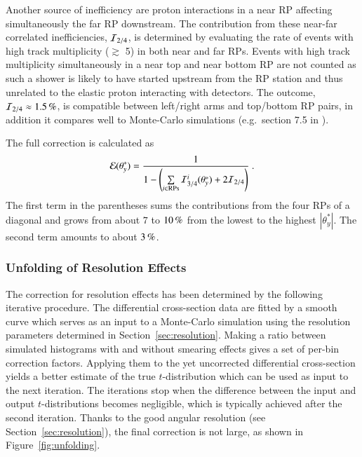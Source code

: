 Another source of inefficiency are proton interactions in a near RP affecting simultaneously the far RP downstream. The contribution from these near-far correlated inefficiencies, ${\cal I}_{2/4}$, is determined by evaluating the rate of events with high track multiplicity ($\gtrsim$ 5) in both near and far RPs. Events with high track multiplicity simultaneously in a near top and near bottom RP are not counted as such a shower is likely to have started upstream from the RP station and thus unrelated to the elastic proton interacting with detectors. The outcome, ${\cal I}_{2/4} \approx 1.5\,{\rm \%}$, is compatible between left/right arms and top/bottom RP pairs, in addition it compares well to Monte-Carlo simulations (e.g.~section 7.5 in \cite{hubert-thesis}).

The full correction is calculated as
\begin{equation}
\label{efficiency}
	{\cal E}(\theta_y^*) = {1\over 1 - \left( \sum\limits_{i\in \rm RPs} {\cal I}^i_{3/4}(\theta_y^*) + 2 {\cal I}_{2/4} \right) } \ .
\end{equation}
The first term in the parentheses sums the contributions from the four RPs of a diagonal and grows from about $7$ to $10\,{\rm \%}$ from the lowest to the highest $|\theta_y^*|$. The second term amounts to about $3\,{\rm \%}$.





\subsubsection{Unfolding of Resolution Effects}
\label{sec:unfolding}

The correction for resolution effects has been determined by the following iterative procedure. The differential cross-section data are fitted by a smooth curve which serves as an input to a Monte-Carlo simulation using the resolution parameters determined in Section~\ref{sec:resolution}. Making a ratio between simulated histograms with and without smearing effects gives a set of per-bin correction factors. Applying them to the yet uncorrected differential cross-section yields a better estimate of the true $t$-distribution which can be used as input to the next iteration. The iterations stop when the difference between the input and output $t$-distributions becomes negligible, which is typically achieved after the second iteration. Thanks to the good angular resolution (see Section~\ref{sec:resolution}), the final correction is not large, as shown in Figure~\ref{fig:unfolding}.

